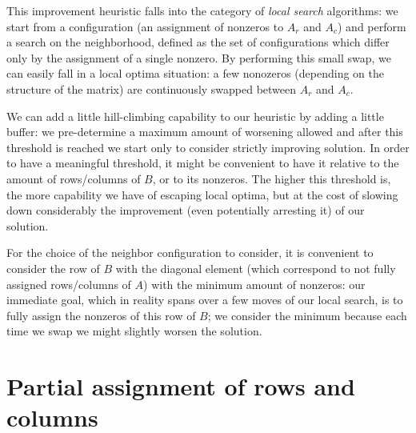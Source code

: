 This improvement heuristic falls into the category of \emph{local search} algorithms: we start from a configuration (an assignment of nonzeros to $A_r$ and $A_c$) and perform a search on the neighborhood, defined as the set of configurations which differ only by the assignment of a single nonzero. By performing this small swap, we can easily fall in a local optima situation: a few nonozeros (depending on the structure of the matrix) are continuously swapped between $A_r$ and $A_c$. 

We can add a little hill-climbing capability to our heuristic by adding a little buffer: we pre-determine a maximum amount of worsening allowed and after this threshold is reached we start only to consider strictly improving solution. In order to have a meaningful threshold, it might be convenient to have it relative to the amount of rows/columns of $B$, or to its nonzeros. The higher this threshold is, the more capability we have of escaping local optima, but at the cost of slowing down considerably the improvement (even potentially arresting it) of our solution.

For the choice of the neighbor configuration to consider, it is convenient to consider the row of $B$ with the diagonal element (which correspond to not fully assigned rows/columns of $A$) with the minimum amount of nonzeros: our immediate goal, which in reality spans over a few moves of our local search, is to fully assign the nonzeros of this row of $B$; we consider the minimum because each time we swap we might slightly worsen the solution.

\section{Partial assignment of rows and columns} \label{sec:hot_restart}

